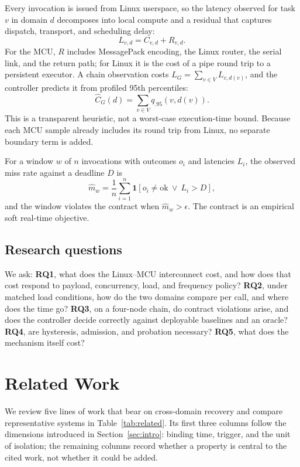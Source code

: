 \documentclass[conference]{IEEEtran}
\begin{document}
Every invocation is issued from Linux userspace, so the latency observed for
task $v$ in domain $d$ decomposes into local compute and a residual that
captures dispatch, transport, and scheduling delay:
\begin{equation}
  L_{v,d} = C_{v,d} + R_{v,d}.
  \label{eq:decomposition}
\end{equation}
For the MCU, $R$ includes MessagePack encoding, the Linux router, the serial
link, and the return path; for Linux it is the cost of a pipe round trip to a
persistent executor. A chain observation costs
$L_G=\sum_{v\in V} L_{v,d(v)}$, and the controller predicts it from profiled
95th percentiles:
\begin{equation}
  \widehat{C}_G(d) = \sum_{v\in V} q_{.95}(v,d(v)).
  \label{eq:cost}
\end{equation}
This is a transparent heuristic, not a worst-case execution-time bound.
Because each MCU sample already includes its round trip from Linux, no
separate boundary term is added.

For a window $w$ of $n$ invocations with outcomes $o_i$ and latencies $L_i$,
the observed miss rate against a deadline $D$ is
\begin{equation}
  \widehat{m}_w=\frac{1}{n}\sum_{i=1}^{n}
  \mathbf{1}\!\left[o_i\ne\mathrm{ok}\ \lor\ L_i>D\right],
  \label{eq:miss}
\end{equation}
and the window violates the contract when $\widehat{m}_w>\epsilon$. The
contract is an empirical soft real-time objective.

\subsection{Research questions}
We ask: \textbf{RQ1}, what does the Linux--MCU interconnect cost, and how does
that cost respond to payload, concurrency, load, and frequency policy?
\textbf{RQ2}, under matched load conditions, how do the two domains compare
per call, and where does the time go? \textbf{RQ3}, on a four-node chain, do
contract violations arise, and does the controller decide correctly against
deployable baselines and an oracle? \textbf{RQ4}, are hysteresis, admission,
and probation necessary? \textbf{RQ5}, what does the mechanism itself cost?

\section{Related Work}
\label{sec:related}
We review five lines of work that bear on cross-domain recovery and compare
representative systems in Table~\ref{tab:related}. Its first three columns
follow the dimensions introduced in Section~\ref{sec:intro}: binding time,
trigger, and the unit of isolation; the remaining columns record whether a
property is central to the cited work, not whether it could be added.
\end{document}
